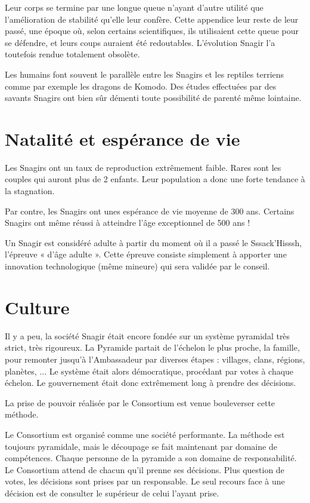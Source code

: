 \begin{multicols}{2}
Leur corps se termine par une longue queue n'ayant d'autre utilité que l'amélioration de stabilité qu'elle leur confère. Cette appendice leur reste de leur passé, une époque où, selon certains scientifiques, ils utilisaient cette queue pour se défendre, et leurs coups auraient été redoutables. L'évolution Snagir l'a toutefois rendue totalement obsolète.

Les humains font souvent le parallèle entre les Snagirs et les reptiles terriens comme par exemple les dragons de Komodo. Des études effectuées par des savants Snagirs ont bien sûr démenti toute possibilité de parenté même lointaine.

\section{Natalité et espérance de vie}

Les Snagirs ont un taux de reproduction extrêmement faible. Rares sont les couples qui auront plus de 2 enfants. Leur population a donc une forte tendance à la stagnation.

Par contre, les Snagirs ont unes espérance de vie moyenne de 300 ans. Certains Snagirs ont même réussi à atteindre l'âge exceptionnel de 500 ans ! 

Un Snagir est considéré adulte à partir du moment où il a passé le Sssack'Hisssh, l'épreuve « d'âge adulte ». Cette épreuve consiste simplement à apporter une innovation technologique (même mineure) qui sera validée par le conseil. 

\section{Culture}

Il y a peu, la société Snagir était encore fondée sur un système pyramidal très strict, très rigoureux. La Pyramide partait de l'échelon le plus proche, la famille, pour remonter jusqu'à l'Ambassadeur par diverses étapes : villages, clans, régions, planètes, ... Le système était alors démocratique, procédant par votes à chaque échelon. Le gouvernement était donc extrêmement long à prendre des décisions.

La prise de pouvoir réalisée par le Consortium est venue bouleverser cette méthode.

Le Consortium est organisé comme une société performante. La méthode est toujours pyramidale, mais le découpage se fait maintenant par domaine de compétences. Chaque personne de la pyramide a son domaine de responsabilité. Le Consortium attend de chacun qu'il prenne ses décisions. Plus question de votes, les décisions sont prises par un responsable. Le seul recours face à une décision est de consulter le supérieur de celui l'ayant prise.


\end{multicols}
